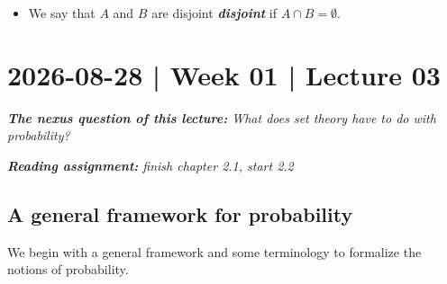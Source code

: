 \documentclass[10pt]{article}
\theoremstyle{definition}
\newcommand{\1}[1]{\textbf{1}_{\left[#1\right]}} %
\DeclareRobustCommand{\demph}[1]{%
  \ifmmode
  {\color{Blue}#1}%
  \else
  {\color{Blue}\bfseries\slshape #1}%
  \fi
}
\begin{document}
\begin{itemize}
  \item We say that \(A\) and \(B\) are \demph{disjoint} if
  $A\cap B=\emptyset$. 
  \begin{center}
  \end{center}
\end{itemize}

\newpage
\section{2026-08-28 | Week 01 | Lecture 03}

\begin{center}
  \begin{tcolorbox}[width=0.9\textwidth, colback=white, colframe=black]
    \textit{\textbf{The nexus question of this lecture:} What does set theory
      have to do with probability?}

    \textit{\textbf{Reading assignment:} finish chapter 2.1, start 2.2}
  \end{tcolorbox}
\end{center}

\subsection{A general framework for probability}
We begin with a general framework and some terminology to formalize the
notions of probability.
\end{document}
